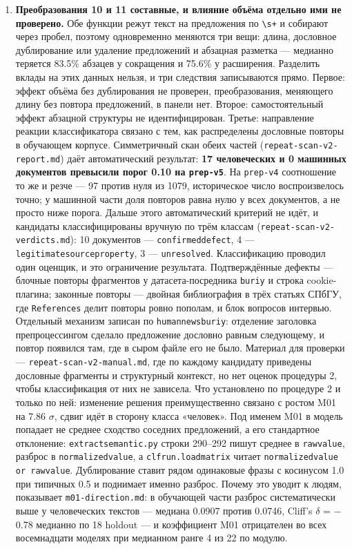 \documentclass[11pt,a4paper]{article}
\renewcommand{\_}{\textunderscore\allowbreak}
\begin{document}
\begin{enumerate}
\item[25.] \textbf{Преобразования 10 и 11 составные, и влияние объёма отдельно ими не проверено.} Обе функции режут текст на предложения по \texttt{\textbackslash{}s+} и собирают через пробел, поэтому одновременно меняются три вещи: длина, дословное дублирование или удаление предложений и абзацная разметка — медианно теряется 83.5\% абзацев у сокращения и 75.6\% у расширения. Разделить вклады на этих данных нельзя, и три следствия записываются прямо. Первое: эффект объёма без дублирования не проверен, преобразования, меняющего длину без повтора предложений, в панели нет. Второе: самостоятельный эффект абзацной структуры не идентифицирован. Третье: направление реакции классификатора связано с тем, как распределены дословные повторы в обучающем корпусе. Симметричный скан обеих частей (\texttt{repeat-\allowbreak{}scan-\allowbreak{}v2-\allowbreak{}report.md}) даёт автоматический результат: \textbf{17 человеческих и 0 машинных документов превысили порог 0.10 на \texttt{prep-\allowbreak{}v5}}. На \texttt{prep-\allowbreak{}v4} соотношение то же и резче — 97 против нуля из 1079, историческое число воспроизвелось точно; у машинной части доля повторов равна нулю у всех документов, а не просто ниже порога. Дальше этого автоматический критерий не идёт, и кандидаты классифицированы вручную по трём классам (\texttt{repeat-\allowbreak{}scan-\allowbreak{}v2-\allowbreak{}verdicts.md}): 10 документов — \texttt{confirmed\_defect}, 4 — \texttt{legitimate\_source\_property}, 3 — \texttt{unresolved}. Классификацию проводил один оценщик, и это ограничение результата. Подтверждённые дефекты — блочные повторы фрагментов у датасета-посредника \texttt{buriy\_2014} и строка cookie-плагина; законные повторы — двойная библиография в трёх статьях СПбГУ, где \texttt{References} делит повторы ровно пополам, и блок вопросов интервью. Отдельный механизм записан по \texttt{human\_news\_buriy\_2014\_0048}: отделение заголовка препроцессингом сделало предложение дословно равным следующему, и повтор появился там, где в сыром файле его не было. Материал для проверки — \texttt{repeat-\allowbreak{}scan-\allowbreak{}v2-\allowbreak{}manual.md}, где по каждому кандидату приведены дословные фрагменты и структурный контекст, но нет оценок процедуры 2, чтобы классификация от них не зависела. Что установлено по процедуре 2 и только по ней: изменение решения преимущественно связано с ростом M01 на 7.86 $\sigma$, сдвиг идёт в сторону класса «человек». Под именем M01 в модель попадает не среднее сходство соседних предложений, а его стандартное отклонение: \texttt{extract\_semantic.py} строки 290–292 пишут среднее в \texttt{raw\_value}, разброс в \texttt{normalized\_value}, а \texttt{clf\_run.load\_matrix} читает \texttt{normalized\_value or raw\_value}. Дублирование ставит рядом одинаковые фразы с косинусом 1.0 при типичных 0.5 и поднимает именно разброс. Почему это уводит к людям, показывает \texttt{m01-\allowbreak{}direction.md}: в обучающей части разброс систематически выше у человеческих текстов — медиана 0.0907 против 0.0746, Cliff's $\delta$ = $-$0.78 медианно по 18 holdout — и коэффициент M01 отрицателен во всех восемнадцати моделях при медианном ранге 4 из 22 по модулю. 
\end{enumerate}
\end{document}
